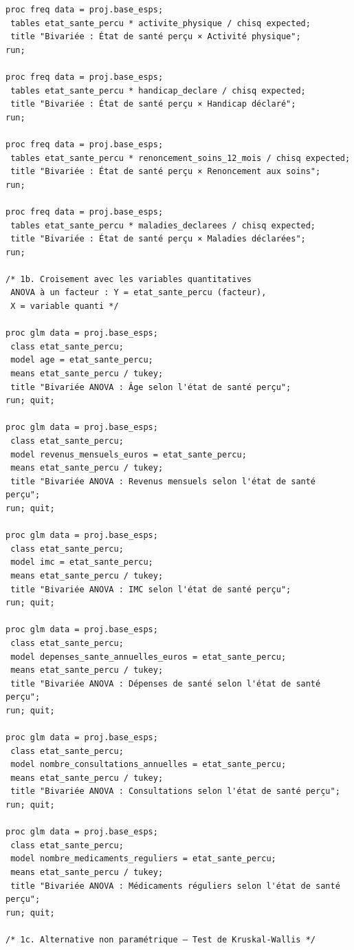 \documentclass[11pt,a4paper]{memoirerecherche}
\begin{document}
\begin{footnotesize}
\begin{verbatim}
proc freq data = proj.base_esps;
 tables etat_sante_percu * activite_physique / chisq expected;
 title "Bivariée : État de santé perçu × Activité physique";
run;

proc freq data = proj.base_esps;
 tables etat_sante_percu * handicap_declare / chisq expected;
 title "Bivariée : État de santé perçu × Handicap déclaré";
run;

proc freq data = proj.base_esps;
 tables etat_sante_percu * renoncement_soins_12_mois / chisq expected;
 title "Bivariée : État de santé perçu × Renoncement aux soins";
run;

proc freq data = proj.base_esps;
 tables etat_sante_percu * maladies_declarees / chisq expected;
 title "Bivariée : État de santé perçu × Maladies déclarées";
run;

/* 1b. Croisement avec les variables quantitatives
 ANOVA à un facteur : Y = etat_sante_percu (facteur),
 X = variable quanti */

proc glm data = proj.base_esps;
 class etat_sante_percu;
 model age = etat_sante_percu;
 means etat_sante_percu / tukey;
 title "Bivariée ANOVA : Âge selon l'état de santé perçu";
run; quit;

proc glm data = proj.base_esps;
 class etat_sante_percu;
 model revenus_mensuels_euros = etat_sante_percu;
 means etat_sante_percu / tukey;
 title "Bivariée ANOVA : Revenus mensuels selon l'état de santé perçu";
run; quit;

proc glm data = proj.base_esps;
 class etat_sante_percu;
 model imc = etat_sante_percu;
 means etat_sante_percu / tukey;
 title "Bivariée ANOVA : IMC selon l'état de santé perçu";
run; quit;

proc glm data = proj.base_esps;
 class etat_sante_percu;
 model depenses_sante_annuelles_euros = etat_sante_percu;
 means etat_sante_percu / tukey;
 title "Bivariée ANOVA : Dépenses de santé selon l'état de santé perçu";
run; quit;

proc glm data = proj.base_esps;
 class etat_sante_percu;
 model nombre_consultations_annuelles = etat_sante_percu;
 means etat_sante_percu / tukey;
 title "Bivariée ANOVA : Consultations selon l'état de santé perçu";
run; quit;

proc glm data = proj.base_esps;
 class etat_sante_percu;
 model nombre_medicaments_reguliers = etat_sante_percu;
 means etat_sante_percu / tukey;
 title "Bivariée ANOVA : Médicaments réguliers selon l'état de santé perçu";
run; quit;

/* 1c. Alternative non paramétrique — Test de Kruskal-Wallis */


\end{verbatim}
\end{footnotesize}
\end{document}
